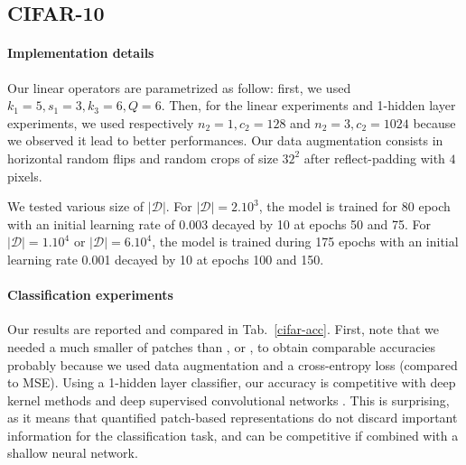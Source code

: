 \documentclass{article}
\begin{document}
\subsection{CIFAR-10}

 \paragraph{Implementation details} Our linear operators are parametrized as follow: first, we used $k_1=5,s_1=3,k_3=6,Q=6$.
 Then, for the linear experiments and 1-hidden layer experiments, we used respectively $n_2=1, c_2=128$ and  $ n_2=3,c_2=1024$ because we observed it lead to better performances.
Our data augmentation consists in horizontal random flips and random crops of size $32^2$ after  reflect-padding with $4$ pixels.

We tested various size of $|\mathcal{D}|$. For $|\mathcal{D}|=2. 10^3$, the model is trained for 80 epoch with an initial learning rate of 0.003 decayed by 10 at epochs 50 and 75.
For  $|\mathcal{D}|=1.10^4$ or $|\mathcal{D}|=6. 10^4$, the model is trained during 175 epochs with an initial learning rate 0.001 decayed by 10 at epochs 100 and  150. 


\paragraph{Classification experiments} Our results are reported and compared in Tab.~\ref{cifar-acc}. First, note that we needed a much smaller of patches  than \cite{recht2019imagenet}, \cite{coates2011analysis} or \cite{mairal2016end}, to obtain comparable accuracies probably because we used data augmentation and a cross-entropy loss (compared to MSE). Using a 1-hidden layer classifier, our accuracy is competitive with deep kernel methods \citep{li2019enhanced,shankar2020neural} and deep supervised convolutional networks \citep{krizhevsky2012imagenet}. This is surprising, as it means that quantified patch-based representations do not discard important information for the classification task, and can be competitive  if combined with a shallow neural network.
\end{document}
